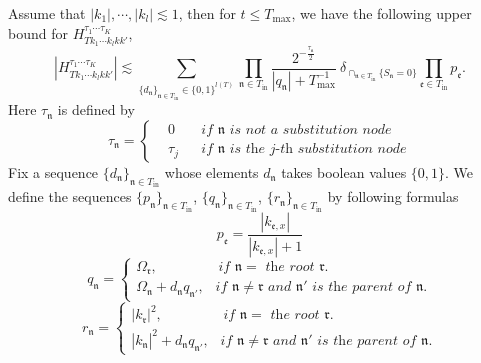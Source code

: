 \begin{lem}\label{lem.boundcoefoperator}
Assume that $|k_1|, \cdots, |k_{l}|\lesssim 1$, then for $t\le  T_{\text{max}}$, we have the following upper bound for $H^{\tau_1\cdots \tau_{K}}_{Tk_1\cdots k_{l}kk'}$,
\begin{equation}\label{eq.boundcoefoperator}
    |H^{\tau_1\cdots \tau_{K}}_{Tk_1\cdots k_{l}kk'}|\lesssim \sum_{\{d_{\mathfrak{n}}\}_{\mathfrak{n}\in T_{\text{in}}}\in\{0,1\}^{l(T)}}\prod_{\mathfrak{n}\in T_{\text{in}}}\frac{2^{-\frac{\tau_{\mathfrak{n}}}{2}}}{|q_{\mathfrak{n}}|+T^{-1}_{\text{max}}}\ \delta_{\cap_{\mathfrak{n}\in T_{\text{in}}} \{S_{\mathfrak{n}}=0\}} \prod_{\mathfrak{e}\in T_{\text{in}}} p_{\mathfrak{e}}.
\end{equation}
Here $\tau_{\mathfrak{n}}$ is defined by 
\begin{equation}
   \tau_{\mathfrak{n}}=\left\{
    \begin{aligned}
        &0 && \textit{if $\mathfrak{n}$ is not a substitution node}
        \\
        &\tau_j  &&\textit{if $\mathfrak{n}$ is the $j$-th substitution node}
    \end{aligned}\right.
\end{equation}
Fix a sequence $\{d_{\mathfrak{n}}\}_{\mathfrak{n}\in T_{\text{in}}}$ whose elements $d_{\mathfrak{n}}$ takes boolean values $\{0,1\}$. We define the sequences $\{p_{\mathfrak{n}}\}_{\mathfrak{n}\in T_{\text{in}}}$, $\{q_{\mathfrak{n}}\}_{\mathfrak{n}\in T_{\text{in}}}$, $\{r_{\mathfrak{n}}\}_{\mathfrak{n}\in T_{\text{in}}}$ by following formulas
\begin{equation}\label{eq.p_noperator}
    p_{\mathfrak{e}}=\frac{|k_{\mathfrak{e},x}|}{|k_{\mathfrak{e},x}|+1}
\end{equation}
\begin{equation}\label{eq.q_noperator}
    q_{\mathfrak{n}}=
    \begin{cases}
    \Omega_{\mathfrak{r}}, \qquad\qquad \textit{ if $\mathfrak{n}=$ the root $\mathfrak{r}$.}
    \\
    \Omega_{\mathfrak{n}}+d_{\mathfrak{n}}q_{\mathfrak{n}'},\ \ \textit{ if $\mathfrak{n}\neq\mathfrak{r}$ and $\mathfrak{n}'$ is the parent of $\mathfrak{n}$.}
    \end{cases}
\end{equation}
\begin{equation}\label{eq.r_noperator}
    r_{\mathfrak{n}}=
    \begin{cases}
    |k_{\mathfrak{r}}|^2, \qquad\qquad \textit{ if $\mathfrak{n}=$ the root $\mathfrak{r}$.}
    \\
    |k_{\mathfrak{n}}|^2+d_{\mathfrak{n}}q_{\mathfrak{n}'},\ \ \textit{ if $\mathfrak{n}\neq\mathfrak{r}$ and $\mathfrak{n}'$ is the parent of $\mathfrak{n}$.}
    \end{cases}
\end{equation}


\end{lem}
